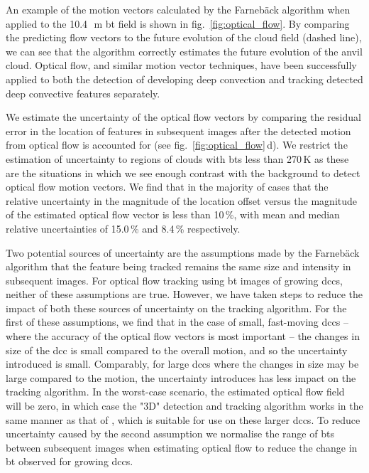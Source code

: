 An example of the motion vectors calculated by the Farnebäck algorithm when applied to the 10.4\,\unit{\mu m} \acrshort{bt} field is shown in fig.~\ref{fig:optical_flow}.
By comparing the predicting flow vectors to the future evolution of the cloud field (dashed line), we can see that the algorithm correctly estimates the future evolution of the anvil cloud.
Optical flow, and similar motion vector techniques, have been successfully applied to both the detection of developing deep convection \citep{zinner_cb-tram:_2008, zhang_locating_2014} and tracking detected deep convective features \citep{senf_size-resolved_2018} separately.

We estimate the uncertainty of the optical flow vectors by comparing the residual error in the location of features in subsequent images after the detected motion from optical flow is accounted for (see fig.~\ref{fig:optical_flow}\,d).
We restrict the estimation of uncertainty to regions of clouds with \acrshort{bt}s less than 270\,\unit{K} as these are the situations in which we see enough contrast with the background to detect optical flow motion vectors.
We find that in the majority of cases that the relative uncertainty in the magnitude of the location offset versus the magnitude of the estimated optical flow vector is less than 10\,\%, with mean and median relative uncertainties of 15.0\,\% and 8.4\,\% respectively.

Two potential sources of uncertainty are the assumptions made by the Farnebäck algorithm that the feature being tracked remains the same size and intensity in subsequent images.
For optical flow tracking using \acrshort{bt} images of growing \acrshort{dcc}s, neither of these assumptions are true.
However, we have taken steps to reduce the impact of both these sources of uncertainty on the tracking algorithm.
For the first of these assumptions, we find that in the case of small, fast-moving \acrshort{dcc}s -- where the accuracy of the optical flow vectors is most important -- the changes in size of the \acrshort{dcc} is small compared to the overall motion, and so the uncertainty introduced is small.
Comparably, for large \acrshort{dcc}s where the changes in size may be large compared to the motion, the uncertainty introduces has less impact on the tracking algorithm.
In the worst-case scenario, the estimated optical flow field will be zero, in which case the "3D" detection and tracking algorithm works in the same manner as that of \citet{fiolleau_algorithm_2013}, which is suitable for use on these larger \acrshort{dcc}s.
To reduce uncertainty caused by the second assumption we normalise the range of \acrshort{bt}s between subsequent images when estimating optical flow to reduce the change in \acrshort{bt} observed for growing \acrshort{dcc}s.

